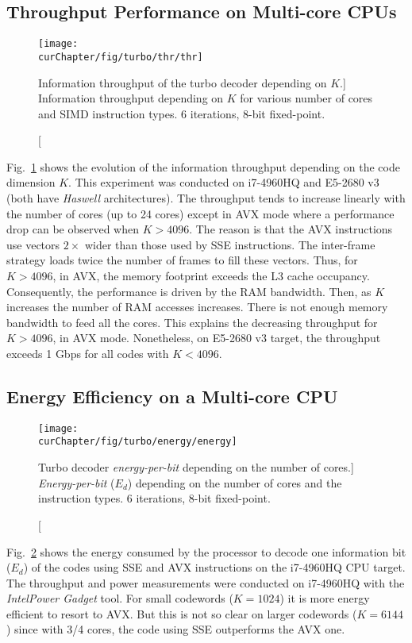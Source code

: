 \subsection{Throughput Performance on Multi-core CPUs}

\begin{figure}[htp]
  \centering
  \texttt{[image: \\curChapter/fig/turbo/thr/thr]}
  \caption
    [Information throughput of the turbo decoder depending on $K$.]
    {Information throughput depending on $K$ for various number of cores and
    SIMD instruction types. 6 iterations, 8-bit fixed-point.}
  \label{plot:eval_turbo_thr}
\end{figure}

Fig.~\ref{plot:eval_turbo_thr} shows the evolution of the information throughput
depending on the code dimension $K$. This experiment was conducted on i7-4960HQ
and E5-2680 v3 (both have \emph{Haswell} architectures). The throughput tends to
increase linearly with the number of cores (up to 24 cores) except in AVX mode
where a performance drop can be observed when $K > 4096$. The reason is that the
AVX instructions use vectors $2\times$ wider than those used by SSE
instructions. The inter-frame strategy loads twice the number of frames to fill
these vectors. Thus, for $K > 4096$, in AVX, the memory footprint exceeds the L3
cache occupancy. Consequently, the performance is driven by the RAM bandwidth.
Then, as $K$ increases the number of RAM accesses increases. There is not enough
memory bandwidth to feed all the cores. This explains the decreasing throughput
for $K > 4096$, in AVX mode. Nonetheless, on E5-2680 v3 target, the throughput
exceeds 1 Gbps for all codes with $K<4096$.

\subsection{Energy Efficiency on a Multi-core CPU}

\begin{figure}[htp]
  \centering
  \texttt{[image: \\curChapter/fig/turbo/energy/energy]}
  \caption
    [Turbo decoder \emph{energy-per-bit} depending on the number of cores.]
    {\emph{Energy-per-bit} ($E_d$) depending on the number of cores and the
    instruction types. 6 iterations, 8-bit fixed-point.}
  \label{plot:eval_turbo_energy}
\end{figure}

Fig.~\ref{plot:eval_turbo_energy} shows the energy consumed by the processor to
decode one information bit ($E_d$) of the codes using SSE and AVX instructions
on the i7-4960HQ CPU target. The throughput and power measurements were
conducted on i7-4960HQ with the \emph{Intel\R Power Gadget} tool. For small
codewords ($K=1024$) it is more energy efficient to resort to AVX. But this is
not so clear on larger codewords ($K=6144$) since with 3/4 cores, the code using
SSE outperforms the AVX one.

